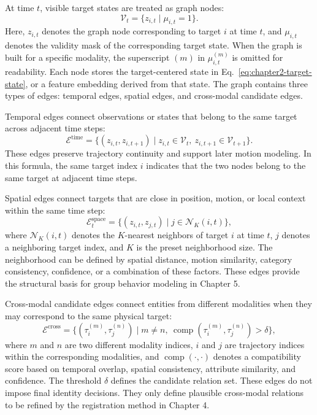 At time \(t\), visible target states are treated as graph nodes:
\begin{equation}
  \mathcal{V}_t
  =
  \{z_{i,t}\mid \mu_{i,t}=1\}.
\end{equation}
Here, \(z_{i,t}\) denotes the graph node corresponding to target \(i\) at time \(t\), and \(\mu_{i,t}\) denotes the validity mask of the corresponding target state. When the graph is built for a specific modality, the superscript \((m)\) in \(\mu_{i,t}^{(m)}\) is omitted for readability. Each node stores the target-centered state in Eq.~\eqref{eq:chapter2-target-state}, or a feature embedding derived from that state. The graph contains three types of edges: temporal edges, spatial edges, and cross-modal candidate edges.

Temporal edges connect observations or states that belong to the same target across adjacent time steps:
\begin{equation}
  \mathcal{E}^{\mathrm{time}}
  =
  \{(z_{i,t},z_{i,t+1})\mid z_{i,t}\in\mathcal{V}_t,\ z_{i,t+1}\in\mathcal{V}_{t+1}\}.
\end{equation}
These edges preserve trajectory continuity and support later motion modeling. In this formula, the same target index \(i\) indicates that the two nodes belong to the same target at adjacent time steps.

Spatial edges connect targets that are close in position, motion, or local context within the same time step:
\begin{equation}
  \mathcal{E}^{\mathrm{space}}_t
  =
  \{(z_{i,t},z_{j,t})\mid j\in\mathcal{N}_K(i,t)\},
\end{equation}
where \(\mathcal{N}_K(i,t)\) denotes the \(K\)-nearest neighbors of target \(i\) at time \(t\), \(j\) denotes a neighboring target index, and \(K\) is the preset neighborhood size. The neighborhood can be defined by spatial distance, motion similarity, category consistency, confidence, or a combination of these factors. These edges provide the structural basis for group behavior modeling in Chapter 5.

Cross-modal candidate edges connect entities from different modalities when they may correspond to the same physical target:
\begin{equation}
  \mathcal{E}^{\mathrm{cross}}
  =
  \{(\tau_i^{(m)},\tau_j^{(n)})\mid m\neq n,\ \operatorname{comp}(\tau_i^{(m)},\tau_j^{(n)})>\delta\},
\end{equation}
where \(m\) and \(n\) are two different modality indices, \(i\) and \(j\) are trajectory indices within the corresponding modalities, and \(\operatorname{comp}(\cdot,\cdot)\) denotes a compatibility score based on temporal overlap, spatial consistency, attribute similarity, and confidence. The threshold \(\delta\) defines the candidate relation set. These edges do not impose final identity decisions. They only define plausible cross-modal relations to be refined by the registration method in Chapter 4.

